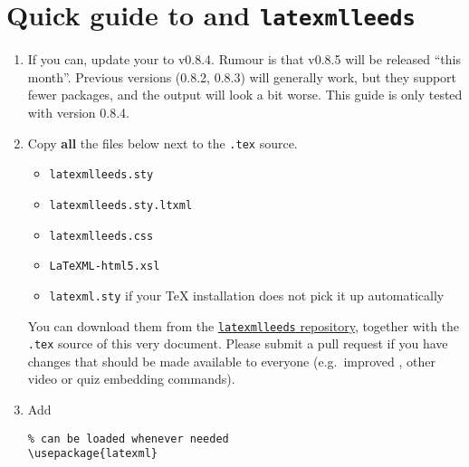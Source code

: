 \documentclass[a4paper]{article}
\theoremstyle{definition}
\begin{document}
\tableofcontents

\section{Quick guide to \texorpdfstring{\LaTeXML{}}{LaTeXML} and \texttt{latexmlleeds}}
\begin{enumerate}
  \item If you can, update your \LaTeXML{} to v0.8.4. Rumour is that v0.8.5 will be released ``this month''. Previous versions (0.8.2, 0.8.3) will generally work, but they support fewer packages, and the output will look a bit worse. This guide is only tested with version 0.8.4.
  \item Copy \textbf{all} the files below next to the \verb|.tex| source.
  \begin{itemize}
    \item \verb|latexmlleeds.sty|
    \item \verb|latexmlleeds.sty.ltxml|
    \item \verb|latexmlleeds.css|
    \item \verb|LaTeXML-html5.xsl|
    \item \verb|latexml.sty| if your \TeX{} installation does not pick it up automatically
  \end{itemize}
  You can download them from the \href{https://dev.azure.com/pmtvlm-leeds-ac-uk/public/_git/latexmlleeds}{\texttt{latexmlleeds} repository}, together with the \verb|.tex| source of this very document. Please submit a pull request if you have changes that should be made available to everyone (e.g.\ improved \CSS{}, other video or quiz embedding commands).
  \item Add
  \begin{lstlisting}[style=latexml]
% for \iflatexml and other goodies
% can be loaded whenever needed
\usepackage{latexml}


\end{lstlisting}
\end{enumerate}
\end{document}

